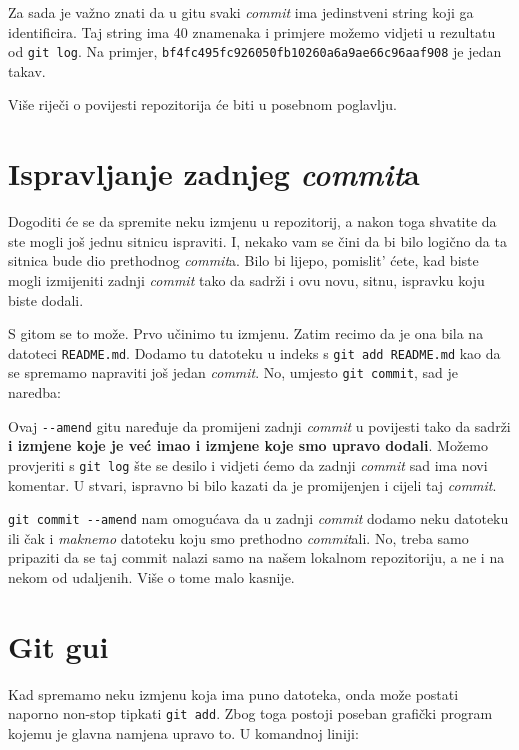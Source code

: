 Za sada je važno znati da u gitu svaki \emph{commit} ima jedinstveni string koji ga identificira.
Taj string ima 40 znamenaka i primjere možemo vidjeti u rezultatu od \verb+git log+.
Na primjer, \verb+bf4fc495fc926050fb10260a6a9ae66c96aaf908+ je jedan takav.

Više riječi o povijesti repozitorija će biti u posebnom poglavlju. 

\section*{Ispravljanje zadnjeg \emph{commit}a}

Dogoditi će se da spremite neku izmjenu u repozitorij, a nakon toga shvatite da ste mogli još jednu sitnicu ispraviti.
I, nekako vam se čini da bi bilo logično da ta sitnica bude dio prethodnog \emph{commit}a.
Bilo bi lijepo, pomislit' ćete, kad biste mogli izmijeniti zadnji \emph{commit} tako da sadrži i ovu novu, sitnu, ispravku koju biste dodali.

S gitom se to može.
Prvo učinimo tu izmjenu. 
Zatim recimo da je ona bila na datoteci \verb+README.md+.
Dodamo tu datoteku u indeks s \verb+git add README.md+ kao da se spremamo napraviti još jedan \emph{commit}.
No, umjesto \verb+git commit+, sad je naredba:


Ovaj \verb+--amend+ gitu naređuje da promijeni zadnji \emph{commit} u povijesti tako da sadrži \textbf{i izmjene koje je već imao i izmjene koje smo upravo dodali}.
Možemo provjeriti s \verb+git log+ šte se desilo i vidjeti ćemo da zadnji \emph{commit} sad ima novi komentar.
U stvari, ispravno bi bilo kazati da je promijenjen i cijeli taj \emph{commit}.

\verb+git commit --amend+ nam omogućava da u zadnji \emph{commit} dodamo neku datoteku ili čak i \emph{maknemo} datoteku koju smo prethodno \emph{commit}ali. 
No, treba samo pripaziti da se taj commit nalazi samo na našem lokalnom repozitoriju, a ne i na nekom od udaljenih. 
Više o tome malo kasnije.

\section*{Git gui}

Kad spremamo neku izmjenu koja ima puno datoteka, onda može postati naporno non-stop tipkati \verb+git add+.
Zbog toga postoji poseban grafički program kojemu je glavna namjena upravo to.
U komandnoj liniji:

